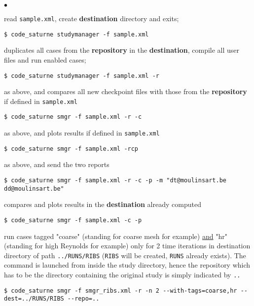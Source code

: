 \documentclass[a4paper,10pt,twoside]{csshortdoc}
\makeatletter
\newcommand*\noindentgroup{\@@par   %
      \@totalleftmargin\z@ \@listdepth\z@ \rightmargin\z@
}
\makeatother
\begin{document}
\begin{list}{$\bullet$}{}
\item read \texttt{sample.xml}, create \textbf{destination} directory and exits;
{\noindentgroup\begin{lstlisting}
$ code_saturne studymanager -f sample.xml
\end{lstlisting}}

\item duplicates all cases from the \textbf{repository} in the \textbf{destination}, compile all user files and run enabled cases;
{\noindentgroup\begin{lstlisting}
$ code_saturne studymanager -f sample.xml -r
\end{lstlisting}}

\item as above, and compares all new checkpoint files with those from the \textbf{repository} if defined in \texttt{sample.xml}
{\noindentgroup\begin{lstlisting}
$ code_saturne smgr -f sample.xml -r -c
\end{lstlisting}}

\item as above, and plots results if defined in \texttt{sample.xml}
{\noindentgroup\begin{lstlisting}
$ code_saturne smgr -f sample.xml -rcp
\end{lstlisting}}

\item as above, and send the two reports
{\noindentgroup\begin{lstlisting}
$ code_saturne smgr -f sample.xml -r -c -p -m "dt@moulinsart.be dd@moulinsart.be"
\end{lstlisting}}

\item compares and plots results in the \textbf{destination} already computed
{\noindentgroup\begin{lstlisting}
$ code_saturne smgr -f sample.xml -c -p
\end{lstlisting}}

\item run cases tagged "coarse" (standing for coarse mesh for example) \underline{and} "hr" (standing for high Reynolds for example) only for 2 time iterations in destination directory of path \texttt{../RUNS/RIBS} (\texttt{RIBS} will be created, \texttt{RUNS} already exists). The command is launched from inside the study directory, hence the repository which has to be the directory containing the original study is simply indicated by \texttt{..}
{\noindentgroup\begin{lstlisting}
$ code_saturne smgr -f smgr_ribs.xml -r -n 2 --with-tags=coarse,hr --dest=../RUNS/RIBS --repo=..
\end{lstlisting}}
\end{list}
\end{document}
